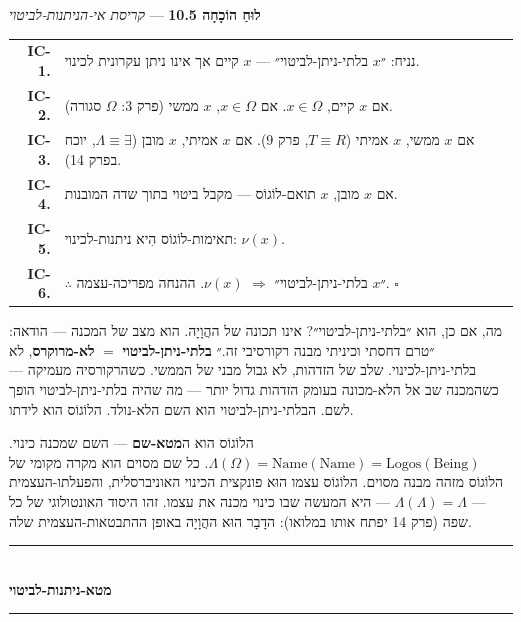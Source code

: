 \documentclass[10pt, openany, oneside]{book}
\renewcommand{\normalsize}{\fontsize{10}{13}\selectfont}
\renewcommand{\footnotesize}{\fontsize{8.5}{11}\selectfont}
\begin{document}
\vspace{0.5em}

\textbf{לוּחַ הוֹכָחָה 10.5} --- \textit{קריסת אי-הניתנות-לביטוי}

\vspace{0.5em}

{\footnotesize
\noindent\begin{tabular}{r p{}}
\textbf{IC-1.} & נניח: ״$x$ בלתי-ניתן-לביטוי״ — $x$ קיים אך אינו ניתן עקרונית לכינוי. \\[0.3em]
\textbf{IC-2.} & אם $x$ קיים, $x \in \Omega$. אם $x \in \Omega$, $x$ ממשי (פרק 3: $\Omega$ סגורה). \\[0.3em]
\textbf{IC-3.} & אם $x$ ממשי, $x$ אמיתי ($T \equiv R$, פרק 9). אם $x$ אמיתי, $x$ מובן ($\Lambda \equiv \exists$, יוכח בפרק 14). \\[0.3em]
\textbf{IC-4.} & אם $x$ מובן, $x$ תואם-לוֹגוֹס — מקבל ביטוי בתוך שדה המובנות. \\[0.3em]
\textbf{IC-5.} & תאימות-לוֹגוֹס הִיא ניתנות-לכינוי: $\nu(x)$. \\[0.3em]
\textbf{IC-6.} & $\therefore$ ״$x$ בלתי-ניתן-לביטוי״ $\Rightarrow$ $\nu(x)$. ההנחה מפריכה-עצמה. $\square$ \\[0.3em]
\end{tabular}
}

\vspace{0.8em}

\noindent מה, אם כן, הוא ״בלתי-ניתן-לביטוי״? אינו תכונה של ההֲוָיָה. הוא מצב של המכנה — הודאה: ״טרם דחסתי וכיניתי מבנה רקורסיבי זה.״ \textbf{בלתי-ניתן-לביטוי} $=$ \textbf{לא-מרוקרס}, לא בלתי-ניתן-לכינוי. שלב של הזדהות, לא גבול מבני של הממשי. כשהרקורסיה מעמיקה — כשהמכנה שב אל הלא-מכונה בעומק הזדהות גדול יותר — מה שהיה בלתי-ניתן-לביטוי הופך לשם. הבלתי-ניתן-לביטוי הוא השם הלא-נולד. הלוֹגוֹס הוא לידתו.

הלוֹגוֹס הוא ה\textbf{מטא-שם} — השם שמכנה כינוי. $\Lambda(\Omega) = \text{Name}(\text{Name}) = \text{Logos}(\text{Being})$. כל שם מסוים הוא מקרה מקומי של הלוֹגוֹס מזהה מבנה מסוים. הלוֹגוֹס עצמו הוּא פונקצית הכינוי האוניברסלית, והפעלתו-העצמית — $\Lambda(\Lambda) = \Lambda$ — היא המעשה שבו כינוי מכנה את עצמו. זהו היסוד האונטולוגי של כל שפה (פרק 14 יפתח אותו במלואו): הדָבָר הוּא ההֲוָיָה באופן ההתבטאות-העצמית שלה.

\vspace{1em}

\begin{center}
    \rule{0.3\textwidth}{0.4pt}\\[0.5em]
    {\normalsize\bfseries\textsc{מטא-ניתנות-לביטוי}}\\[0.3em]
    \rule{0.3\textwidth}{0.4pt}
\end{center}
\end{document}

